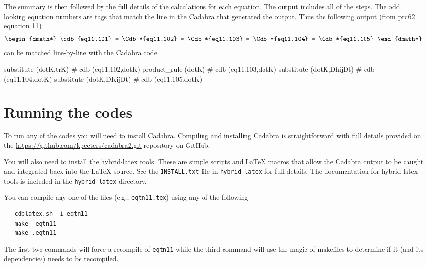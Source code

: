 \documentclass[12pt]{cdblatex}
\begin{document}
The summary is then followed by the full details of the calculations for each
equation. The output includes all of the steps. The odd looking equation numbers are
tags that match the line in the Cadabra that generated the output. Thus the following
output (from prd62 equation 11)
%
\begin{dgroup*}[spread=5pt]
   \begin{dmath*}
      \cdb{eq11.101}
         = \Cdb*{eq11.102}
         = \Cdb*{eq11.103}
         = \Cdb*{eq11.104}
         = \Cdb*{eq11.105}
   \end{dmath*}
\end{dgroup*}
%
can be matched line-by-line with the Cadabra code
%
\begin{cadabra}[numbers=none]
   substitute     (dotK,trK)           # cdb (eq11.102,dotK)
   product_rule   (dotK)               # cdb (eq11.103,dotK)
   substitute     (dotK,DhijDt)        # cdb (eq11.104,dotK)
   substitute     (dotK,DKijDt)        # cdb (eq11.105,dotK)
\end{cadabra}

\clearpage

\section*{Running the codes}

To run any of the codes you will need to install Cadabra. Compiling and installing
Cadabra is straightforward with full details provided on the
\url{https://github.com/kpeeters/cadabra2.git} repository on GitHub.

You will also need to install the hybrid-latex tools. These are simple scripts and
LaTeX macros that allow the Cadabra output to be caught and integrated back into the
LaTeX source. See the {\tt INSTALL.txt} file in {\tt hybrid-latex} for full details.
The documentation for hybrid-latex tools is included in the {\tt hybrid-latex}
directory.

You can compile any one of the files (e.g., {\tt eqtn11.tex}) using any of the
following

\lstset{numbers=none}
\begin{lstlisting}
   cdblatex.sh -i eqtn11
   make  eqtn11
   make .eqtn11
\end{lstlisting}

The first two commands will force a recompile of {\tt eqtn11} while the third command
will use the magic of makefiles to determine if it (and its dependencies) needs to be
recompiled.
\end{document}
